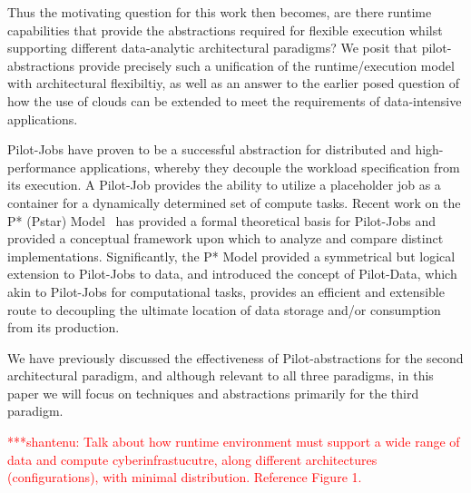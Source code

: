 \documentclass[times]{cpeauth}
\newcommand{\jhanote}[1]{ {\textcolor{red} { ***shantenu: #1 }}}
\newcommand{\jhanote}[1]{}
\newcommand{\pilotjob}{Pilot-Job\xspace}
\newcommand{\pilotjobs}{Pilot-Jobs\xspace}
\begin{document}
Thus the motivating question for this work then becomes, are there
runtime capabilities that provide the abstractions required for
flexible execution whilst supporting different data-analytic
architectural paradigms?  We posit that pilot-abstractions provide
precisely such a unification of the runtime/execution model with
architectural flexibiltiy, as well as an answer to the earlier posed
question of how the use of clouds can be extended to meet the
requirements of data-intensive applications.


\pilotjobs have proven to be a successful abstraction for distributed
and high-performance applications, whereby they decouple the workload
specification from its execution. A \pilotjob provides the ability to
utilize a placeholder job as a container for a dynamically determined
set of compute tasks. Recent work on the P* (Pstar)
Model~\cite{pstar12} has provided a formal theoretical basis for
Pilot-Jobs and provided a conceptual framework upon which to analyze
and compare distinct implementations. Significantly, the P* Model
provided a symmetrical but logical extension to Pilot-Jobs to data,
and introduced the concept of Pilot-Data, which akin to Pilot-Jobs for
computational tasks, provides an efficient and extensible route to
decoupling the ultimate location of data storage and/or consumption
from its production.

We have previously discussed the effectiveness of Pilot-abstractions
for the second architectural paradigm, and although relevant to all
three paradigms, in this paper we will focus on techniques and
abstractions primarily for the third paradigm.
 



\jhanote{Talk about how runtime environment must support a wide range
  of data and compute cyberinfrastucutre, along different
  architectures (configurations), with minimal distribution. Reference
  Figure 1.}
\end{document}
